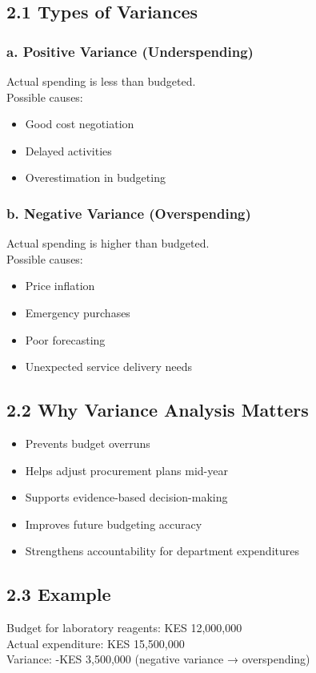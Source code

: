 \documentclass[10pt]{article}
\begin{document}
\subsection*{2.1 Types of Variances}
\subsubsection*{a. Positive Variance (Underspending)}
Actual spending is less than budgeted.\\
Possible causes:

\begin{itemize}
  \item Good cost negotiation
  \item Delayed activities
  \item Overestimation in budgeting
\end{itemize}

\subsubsection*{b. Negative Variance (Overspending)}
Actual spending is higher than budgeted.\\
Possible causes:

\begin{itemize}
  \item Price inflation
  \item Emergency purchases
  \item Poor forecasting
  \item Unexpected service delivery needs
\end{itemize}

\subsection*{2.2 Why Variance Analysis Matters}
\begin{itemize}
  \item Prevents budget overruns
  \item Helps adjust procurement plans mid-year
  \item Supports evidence-based decision-making
  \item Improves future budgeting accuracy
  \item Strengthens accountability for department expenditures
\end{itemize}

\subsection*{2.3 Example}
Budget for laboratory reagents: KES 12,000,000\\
Actual expenditure: KES 15,500,000\\
Variance: -KES 3,500,000 (negative variance → overspending)
\end{document}
